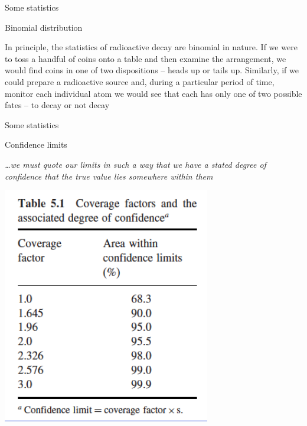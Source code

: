 \begin{frame}{Some statistics}

{\centering \alert{Binomial distribution}}

In principle, the statistics of radioactive decay are binomial in nature. If we were to toss a handful of coins onto a table and then examine the arrangement, we would find coins in one of two dispositions – heads up or tails up. Similarly, if we could prepare a radioactive source and, during a particular period of time, monitor each individual atom we would see that each has only one of two possible fates – to decay or not decay

\end{frame}

\begin{frame}{Some statistics}

{\centering \alert{Confidence limits}}

\emph{\ldots we must quote our limits in such a way that we have a stated degree of confidence that the true value lies somewhere within them}

\centering
\includegraphics[scale=0.4]{figures/confidencelimits.png}

\end{frame}

